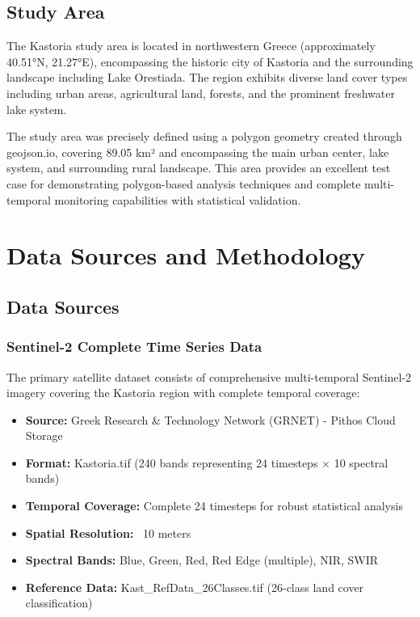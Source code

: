 \documentclass[a4paper,12pt]{article}
\begin{document}
\subsection{Study Area}

The Kastoria study area is located in northwestern Greece (approximately
40.51°N, 21.27°E), encompassing the historic city of Kastoria and the
surrounding landscape including Lake Orestiada. The region exhibits diverse
land cover types including urban areas, agricultural land, forests, and the
prominent freshwater lake system.

The study area was precisely defined using a polygon geometry created through
geojson.io, covering 89.05 km² and encompassing the main urban center, lake
system, and surrounding rural landscape. This area provides an excellent test
case for demonstrating polygon-based analysis techniques and complete
multi-temporal monitoring capabilities with statistical validation.

\section{Data Sources and Methodology}

\subsection{Data Sources}

\subsubsection{Sentinel-2 Complete Time Series Data}

The primary satellite dataset consists of comprehensive multi-temporal Sentinel-2 imagery
covering the Kastoria region with complete temporal coverage:

\begin{itemize}
    \item \textbf{Source:} Greek Research \& Technology Network (GRNET) - Pithos Cloud Storage
    \item \textbf{Format:} Kastoria.tif (240 bands representing 24 timesteps × 10 spectral bands)
    \item \textbf{Temporal Coverage:} Complete 24 timesteps for robust statistical analysis
    \item \textbf{Spatial Resolution:} ~10 meters
    \item \textbf{Spectral Bands:} Blue, Green, Red, Red Edge (multiple), NIR, SWIR
    \item \textbf{Reference Data:} Kast\_RefData\_26Classes.tif (26-class land cover classification)
\end{itemize}
\end{document}
